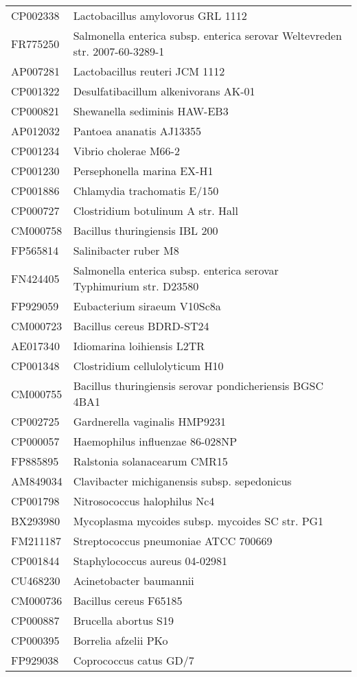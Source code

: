\begin{longtable}{ll}
CP002338 & Lactobacillus amylovorus GRL 1112\\
FR775250 & Salmonella enterica subsp. enterica serovar Weltevreden str. 2007-60-3289-1\\
AP007281 & Lactobacillus reuteri JCM 1112\\
CP001322 & Desulfatibacillum alkenivorans AK-01\\
CP000821 & Shewanella sediminis HAW-EB3\\
AP012032 & Pantoea ananatis AJ13355\\
CP001234 & Vibrio cholerae M66-2\\
CP001230 & Persephonella marina EX-H1\\
CP001886 & Chlamydia trachomatis E/150\\
CP000727 & Clostridium botulinum A str. Hall\\
CM000758 & Bacillus thuringiensis IBL 200\\
FP565814 & Salinibacter ruber M8\\
FN424405 & Salmonella enterica subsp. enterica serovar Typhimurium str. D23580\\
FP929059 & Eubacterium siraeum V10Sc8a\\
CM000723 & Bacillus cereus BDRD-ST24\\
AE017340 & Idiomarina loihiensis L2TR\\
CP001348 & Clostridium cellulolyticum H10\\
CM000755 & Bacillus thuringiensis serovar pondicheriensis BGSC 4BA1\\
CP002725 & Gardnerella vaginalis HMP9231\\
CP000057 & Haemophilus influenzae 86-028NP\\
FP885895 & Ralstonia solanacearum CMR15\\
AM849034 & Clavibacter michiganensis subsp. sepedonicus\\
CP001798 & Nitrosococcus halophilus Nc4\\
BX293980 & Mycoplasma mycoides subsp. mycoides SC str. PG1\\
FM211187 & Streptococcus pneumoniae ATCC 700669\\
CP001844 & Staphylococcus aureus 04-02981\\
CU468230 & Acinetobacter baumannii\\
CM000736 & Bacillus cereus F65185\\
CP000887 & Brucella abortus S19\\
CP000395 & Borrelia afzelii PKo\\
FP929038 & Coprococcus catus GD/7\\

\end{longtable}
